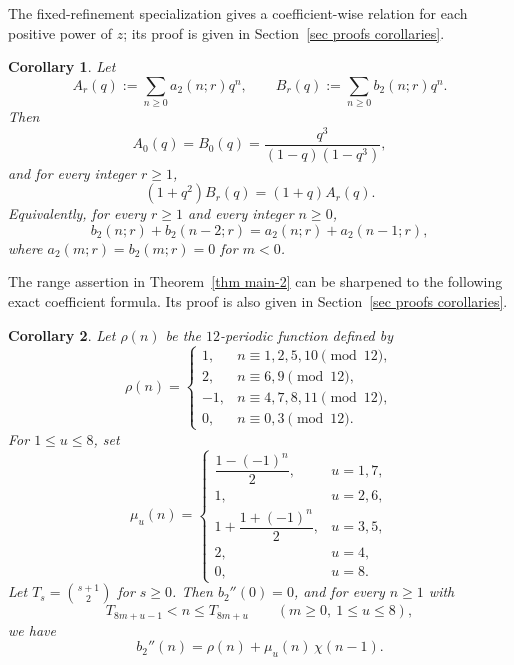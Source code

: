 \documentclass[reqno]{amsart}
\theoremstyle{definition}
\theoremstyle{plain}
\newtheorem{corollary}  {Corollary}
\theoremstyle{remark}
\numberwithin{equation}{section}
\begin{document}
The fixed-refinement specialization gives a coefficient-wise relation for each positive power of $z$; its proof is given in Section~\ref{sec proofs corollaries}.
\begin{corollary}\label{cor fixed-r}
Let
\[
A_r(q):=\sum_{n\ge 0} a_2(n;r)q^n,\qquad B_r(q):=\sum_{n\ge 0} b_2(n;r)q^n.
\]
Then
\[
A_0(q)=B_0(q)=\frac{q^3}{(1-q)(1-q^3)},
\]
and for every integer $r\ge 1$,
\begin{equation}\label{eq fixed-r relation}
(1+q^2)B_r(q)=(1+q)A_r(q).
\end{equation}
Equivalently, for every $r\ge 1$ and every integer $n\ge 0$,
\begin{equation}\label{eq fixed-r coeff relation}
b_2(n;r)+b_2(n-2;r)=a_2(n;r)+a_2(n-1;r),
\end{equation}
where $a_2(m;r)=b_2(m;r)=0$ for $m<0$.
\end{corollary}

The range assertion in Theorem~\ref{thm main-2} can be sharpened to the following exact coefficient formula. Its proof is also given in Section~\ref{sec proofs corollaries}.

\begin{corollary}\label{cor exact formula for bpp}
Let $\rho(n)$ be the $12$-periodic function defined by
\[
\rho(n)=
\begin{cases}
1, & n\equiv 1,2,5,10\pmod{12},\\
2, & n\equiv 6,9\pmod{12},\\
-1, & n\equiv 4,7,8,11\pmod{12},\\
0, & n\equiv 0,3\pmod{12}.
\end{cases}
\]
For $1\le u\le 8$, set
\begin{equation}\label{eq mu-definition}
\mu_u(n)=
\begin{cases}
\dfrac{1-(-1)^n}{2}, & u=1,7,\\[6pt]
1, & u=2,6,\\[4pt]
1+\dfrac{1+(-1)^n}{2}, & u=3,5,\\[6pt]
2, & u=4,\\[4pt]
0, & u=8.
\end{cases}
\end{equation}
Let $T_s=\binom{s+1}{2}$ for $s\ge 0$.  Then $b_2''(0)=0$, and for every $n\ge 1$ with
\[
T_{8m+u-1}<n\le T_{8m+u}\qquad (m\ge 0,\ 1\le u\le 8),
\]
we have
\begin{equation}\label{eq exact bpp}
b_2''(n)=\rho(n)+\mu_u(n)\,\chi(n-1).
\end{equation}
\end{corollary}
\end{document}
